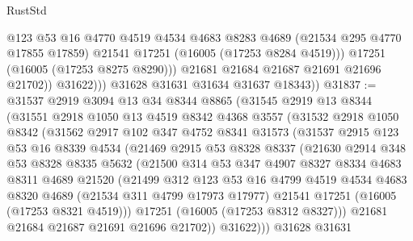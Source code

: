\begin{lexlean}{RustStd}
\begin{coremodule}
                      @123
                      @53
                      @16
                      @4770
                      @4519
                      @4534
                      @4683
                      @8283
                      @4689
                      (@21534 @295 @4770 @17855 @17859)
                      @21541
                      @17251
                      (@16005 (@17253 @8284 @4519)))
                    @17251
                    (@16005 (@17253 @8275 @8290)))
                  @21681
                  @21684
                  @21687
                  @21691
                  @21696
                  @21702))
              @31622)))
        @31628
        @31631
        @31634
        @31637
        @18343))
@31837 := @31537
    @2919
    @3094
    @13
    @34
    @8344
    @8865
    (@31545
      @2919
      @13
      @8344
      (@31551
        @2918
        @1050
        @13
        @4519
        @8342
        @4368
        @3557
        (@31532
          @2918
          @1050
          @8342
          (@31562
            @2917
            @102
            @347
            @4752
            @8341
            @31573
            (@31537
              @2915
              @123
              @53
              @16
              @8339
              @4534
              (@21469
                @2915
                @53
                @8328
                @8337
                (@21630
                  @2914
                  @348
                  @53
                  @8328
                  @8335
                  @5632
                  (@21500
                    @314
                    @53
                    @347
                    @4907
                    @8327
                    @8334
                    @4683
                    @8311
                    @4689
                    @21520
                    (@21499
                      @312
                      @123
                      @53
                      @16
                      @4799
                      @4519
                      @4534
                      @4683
                      @8320
                      @4689
                      (@21534 @311 @4799 @17973 @17977)
                      @21541
                      @17251
                      (@16005 (@17253 @8321 @4519)))
                    @17251
                    (@16005 (@17253 @8312 @8327)))
                  @21681
                  @21684
                  @21687
                  @21691
                  @21696
                  @21702))
              @31622)))
        @31628
        @31631

\end{coremodule}
\end{lexlean}
